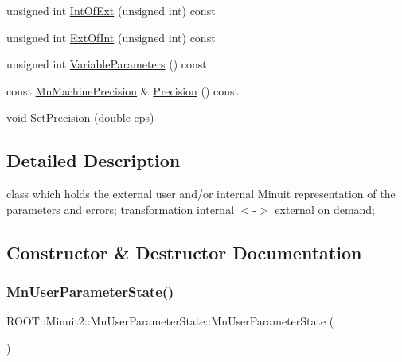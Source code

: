 \begin{DoxyCompactItemize}
\item 
unsigned int \mbox{\hyperlink{classROOT_1_1Minuit2_1_1MnUserParameterState_ab07f3ff917c70471b327243764aaad83}{Int\+Of\+Ext}} (unsigned int) const
\item 
unsigned int \mbox{\hyperlink{classROOT_1_1Minuit2_1_1MnUserParameterState_a9ab7bee2faaac9a607d090eb11926150}{Ext\+Of\+Int}} (unsigned int) const
\item 
unsigned int \mbox{\hyperlink{classROOT_1_1Minuit2_1_1MnUserParameterState_a8226cef71821d2558f31570f002631a4}{Variable\+Parameters}} () const
\item 
const \mbox{\hyperlink{classROOT_1_1Minuit2_1_1MnMachinePrecision}{Mn\+Machine\+Precision}} \& \mbox{\hyperlink{classROOT_1_1Minuit2_1_1MnUserParameterState_aff32da1a78b79f578541e42e91e37563}{Precision}} () const
\item 
void \mbox{\hyperlink{classROOT_1_1Minuit2_1_1MnUserParameterState_aab7787768e533471839387ef51a75cbb}{Set\+Precision}} (double eps)
\end{DoxyCompactItemize}


\subsection{Detailed Description}
class which holds the external user and/or internal Minuit representation of the parameters and errors; transformation internal $<$-\/$>$ external on demand; 

\subsection{Constructor \& Destructor Documentation}
\mbox{\label{classROOT_1_1Minuit2_1_1MnUserParameterState_aa327732c14a8771b3ae0cb5a67bba9f7}} 
\subsubsection{\texorpdfstring{MnUserParameterState()}{MnUserParameterState()}\hspace{0.1cm}{\footnotesize\ttfamily [1/16]}}
{\footnotesize\ttfamily R\+O\+O\+T\+::\+Minuit2\+::\+Mn\+User\+Parameter\+State\+::\+Mn\+User\+Parameter\+State (\begin{DoxyParamCaption}{ }\end{DoxyParamCaption})\hspace{0.3cm}{\ttfamily [inline]}}



